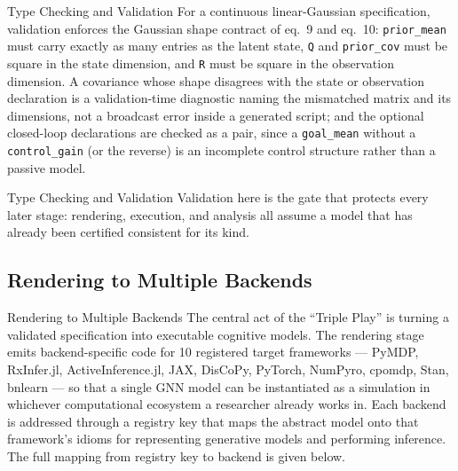 \documentclass[
  ignorenonframetext,
]{beamer}
\begin{document}
\begin{frame}{Type Checking and Validation}
For a continuous linear-Gaussian specification, validation enforces the
Gaussian shape contract of eq.~9 and
eq.~10: \texttt{prior\_mean} must carry exactly as many
entries as the latent state, \texttt{Q} and \texttt{prior\_cov} must be
square in the state dimension, and \texttt{R} must be square in the
observation dimension. A covariance whose shape disagrees with the state
or observation declaration is a validation-time diagnostic naming the
mismatched matrix and its dimensions, not a broadcast error inside a
generated script; and the optional closed-loop declarations are checked
as a pair, since a \texttt{goal\_mean} without a \texttt{control\_gain}
(or the reverse) is an incomplete control structure rather than a
passive model.

\end{frame}

\begin{frame}{Type Checking and Validation}
Validation here is the gate that protects every later stage: rendering,
execution, and analysis all assume a model that has already been
certified consistent for its kind.
\end{frame}

\subsection{Rendering to Multiple
Backends}\label{rendering-to-multiple-backends}

\begin{frame}{Rendering to Multiple Backends}
The central act of the ``Triple Play'' is turning a validated
specification into executable cognitive models. The rendering stage
emits backend-specific code for 10 registered target frameworks ---
PyMDP, RxInfer.jl, ActiveInference.jl, JAX, DisCoPy, PyTorch, NumPyro,
cpomdp, Stan, bnlearn --- so that a single GNN model can be instantiated
as a simulation in whichever computational ecosystem a researcher
already works in. Each backend is addressed through a registry key that
maps the abstract model onto that framework's idioms for representing
generative models and performing inference. The full mapping from
registry key to backend is given below.

\end{frame}
\end{document}
